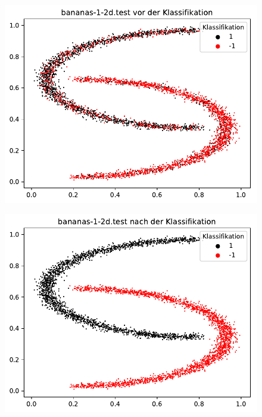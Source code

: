 \documentclass{beamer}
\begin{document}
\begin{figure}[h]
\centering
\includegraphics[scale=0.7]{bananas-1-2d-test-vorher.pdf}
\label{bananas}
\end{figure}

\begin{figure}[h]
\centering
\includegraphics[scale=0.7]{bananas-1-2d-test-nacher.pdf}
\label{bananas}
\end{figure}

\end{document}
